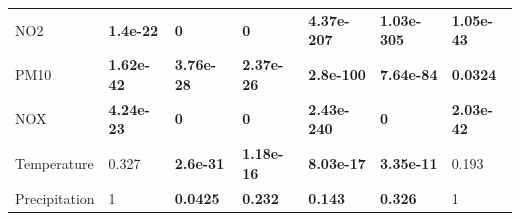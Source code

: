 \documentclass[a4paper, 12pt]{article}
\begin{document}
\begin{table}[t!]
{\begin{tabular}{@{}lllllll@{}}
            NO2                  & \textbf{1.4e-22}                                                                           & \textbf{0}                                                                                 & \textbf{0}                                                                                 & \textbf{4.37e-207}                                                                         & \textbf{1.03e-305}                                                                         & \textbf{1.05e-43}                                                                          \\
            PM10                 & \textbf{1.62e-42}                                                                          & \textbf{3.76e-28}                                                                          & \textbf{2.37e-26}                                                                          & \textbf{2.8e-100}                                                                          & \textbf{7.64e-84}                                                                          & \textbf{0.0324}                                                                            \\
            NOX                  & \textbf{4.24e-23}                                                                          & \textbf{0}                                                                                 & \textbf{0}                                                                                 & \textbf{2.43e-240}                                                                         & \textbf{0}                                                                                 & \textbf{2.03e-42}                                                                          \\
            Temperature          & 0.327                                                                                      & \textbf{2.6e-31}                                                                           & \textbf{1.18e-16}                                                                          & \textbf{8.03e-17}                                                                          & \textbf{3.35e-11}                                                                          & 0.193                                                                                      \\
            Precipitation        & 1                                                                                          & \textbf{0.0425}                                                                            & \textbf{0.232}                                                                             & \textbf{0.143}                                                                             & \textbf{0.326}                                                                             & 1                                                                                          \\

\end{tabular}}
\end{table}
\end{document}
